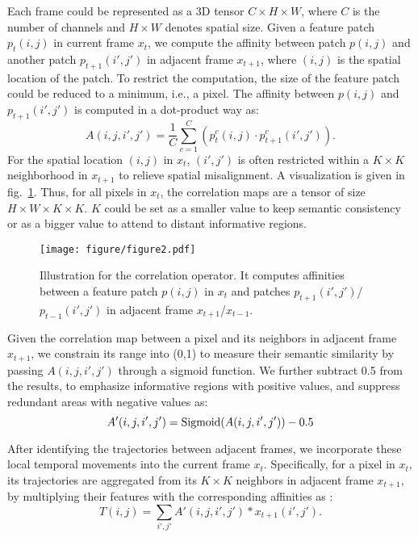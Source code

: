 \documentclass[10pt,twocolumn,letterpaper]{article}
\begin{document}
Each frame could be represented as a 3D tensor $C\times H \times W$, where $C$ is the number of channels and $H\times W$ denotes spatial size. Given a feature patch $p_t(i,j)$ in current frame $x_t$, we compute the affinity between patch $p(i,j)$ and another patch $p_{t+1}(i',j')$ in adjacent frame $x_{t+1}$, where $(i,j)$ is the spatial location of the patch. To restrict the computation, the size of the feature patch could be reduced to a minimum, i.e., a pixel. The affinity between $p(i,j)$ and $p_{t+1}(i',j')$ is computed in a dot-product way as: 
\begin{equation}
  \label{e1}
  A(i,j,i',j') = \frac{1}{C} \sum_{c=1}^{C}{ (p^c_t(i,j) \cdot p^c_{t+1}(i',j')).}
\end{equation}
For the spatial location $(i,j)$ in $x_t$, $(i',j')$ is often restricted within a $K\times K$ neighborhood in $x_{t+1}$ to relieve spatial misalignment. A visualization is given in fig.~\ref{fig2}. Thus, for all pixels in $x_t$, the correlation maps are a tensor of size $H\times W\times K \times K$. $K$ could be set as a smaller value to keep semantic consistency or as a bigger value to attend to distant informative regions. 

\begin{figure}[t]
  \centering
  \texttt{[image: figure/figure2.pdf]}
  \caption{ Illustration for the correlation operator. It computes affinities between a feature patch $p(i,j)$ in $x_t$ and patches $p_{t+1}(i',j')$/$p_{t-1}(i',j')$ in adjacent frame $x_{t+1}$/$x_{t-1}$.}
  \label{fig2}
  \vspace{-5px}
  \end{figure}

Given the correlation map between a pixel and its neighbors in adjacent frame $x_{t+1}$, we constrain its range into (0,1) to measure their semantic similarity by passing $A(i,j,i',j')$ through a sigmoid function. We further subtract 0.5 from the results, to emphasize informative regions with positive values, and suppress redundant areas with negative values as:
\begin{equation}
  \label{e2}
  A'(i,j,i',j') = {\rm Sigmoid}(A(i,j,i',j'))-0.5
\end{equation}

After identifying the trajectories between adjacent frames, we incorporate these local temporal movements into the current frame $x_t$. Specifically, for a pixel in $x_t$, its trajectories are aggregated from its $K\times K$ neighbors in adjacent frame $x_{t+1}$, by multiplying their features with the corresponding affinities as :
\begin{equation}
  \label{e3}
   T(i,j) = \sum_{i',j'}{A'(i,j,i',j') * x_{t+1}(i',j').}
\end{equation}
\end{document}
